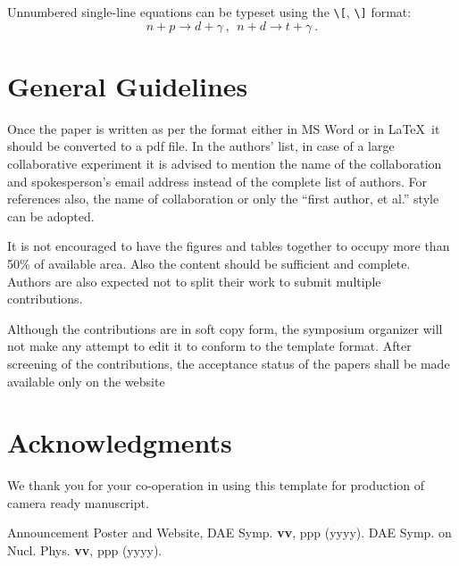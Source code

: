 \documentclass[twocolumn,amsmath,amssymb]{snp}
\begin{document}
Unnumbered single-line equations can be typeset
using the \verb+\[+, \verb+\]+ format:
\[n+p \rightarrow d+\gamma ~,~~n+d\rightarrow
t+\gamma ~. \] 



\section*{General Guidelines}
Once the paper is written as per the format either in MS Word or in \LaTeX\, it should be converted to a pdf file. 
In the authors' list, in 
case of a large collaborative experiment it is advised to mention the name of the collaboration and spokesperson's 
email address instead of the complete list of authors. For references also, the name of collaboration or only the 
``first author, et al.'' style can be adopted. 

It is not encouraged to have the figures and tables together to occupy more than 50\% of available area. Also the content should be sufficient and complete. Authors are also expected not to split their work to submit multiple contributions.

Although the contributions are in soft copy form, the symposium organizer will not make any attempt to 
edit it to conform to the template format.  After screening of the contributions, the 
acceptance status of the papers shall be made available only on the website 


\section*{Acknowledgments}
 We thank you for your co-operation in using this template  for production of camera ready manuscript.

\begin{thebibliography}{50}
 Announcement Poster and Website, DAE Symp. {\bf vv}, ppp (yyyy).
 DAE Symp. on Nucl. Phys. {\bf vv}, ppp (yyyy).
\end{thebibliography}
\end{document}

